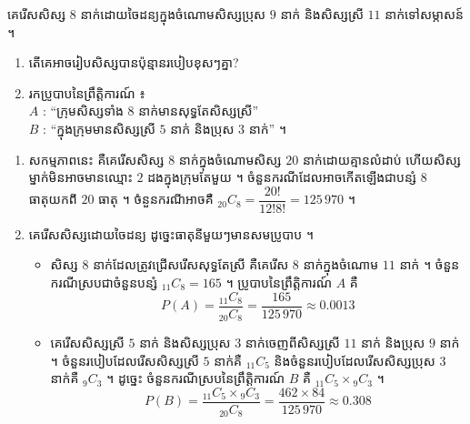 \begin{example}[លំហាត់គំរូ ១]
គេរើសសិស្ស $8$ នាក់ដោយចៃដន្យក្នុងចំណោមសិស្សប្រុស $9$ នាក់ និងសិស្សស្រី $11$ នាក់ទៅសម្ភាសន៍ ។
\begin{enumerate}[a]
  \item តើគេអាចរៀបសិស្សបានប៉ុន្មានរបៀបខុសៗគ្នា?
  \item រកប្រូបាបនៃព្រឹត្តិការណ៍ ៖\\
  $A$ : “ក្រុមសិស្សទាំង $8$ នាក់មានសុទ្ធតែសិស្សស្រី”\\
  $B$ : “ក្នុងក្រុមមានសិស្សស្រី $5$ នាក់ និងប្រុស $3$ នាក់” ។
\end{enumerate}
\ans
\begin{enumerate}[a]
  \item សកម្មភាពនេះ គឺគេរើសសិស្ស $8$ នាក់ក្នុងចំណោមសិស្ស $20$ នាក់ដោយគ្មានលំដាប់ ហើយសិស្សម្នាក់មិនអាចមានឈ្មោះ $2$ ដងក្នុងក្រុមតែមួយ ។ ចំនួនករណីដែលអាចកើតឡើងជាបន្សំ $8$ ធាតុយកពី $20$ ធាតុ ។ ចំនួនករណីអាចគឺ ${}_{20}C_8 = \dfrac{20!}{12!8!} = 125\,970$ ។
  \item គេរើសសិស្សដោយចៃដន្យ ដូច្នេះធាតុនីមួយៗមានសមប្រូបាប ។
  \begin{itemize}
    \item សិស្ស $8$ នាក់ដែលត្រូវជ្រើសរើសសុទ្ធតែស្រី គឺគេរើស $8$ នាក់ក្នុងចំណោម $11$ នាក់ ។ ចំនួនករណីស្របជាចំនួនបន្សំ ${}_{11}C_8 = 165$ ។ ប្រូបាបនៃព្រឹត្តិការណ៍ $A$ គឺ
    \[
    P(A) = \frac{{}_{11}C_8}{{}_{20}C_8} = \frac{165}{125\,970} \approx 0.0013
    \]
    \item គេរើសសិស្សស្រី $5$ នាក់ និងសិស្សប្រុស $3$ នាក់ចេញពីសិស្សស្រី $11$ នាក់ និងប្រុស $9$ នាក់ ។ ចំនួនរបៀបដែលរើសសិស្សស្រី $5$ នាក់គឺ ${}_{11}C_5$ និងចំនួនរបៀបដែលរើសសិស្សប្រុស $3$ នាក់គឺ ${}_9C_3$ ។ ដូច្នេះ ចំនួនករណីស្របនៃព្រឹត្តិការណ៍ $B$ គឺ ${}_{11}C_5\times{}_9C_3$ ។
    \[
    P(B) = \frac{{}_{11}C_5\times{}_9C_3}{{}_{20}C_8} = \frac{462\times 84}{125\,970} \approx 0.308
    \]
  \end{itemize}
\end{enumerate}
\end{example}

